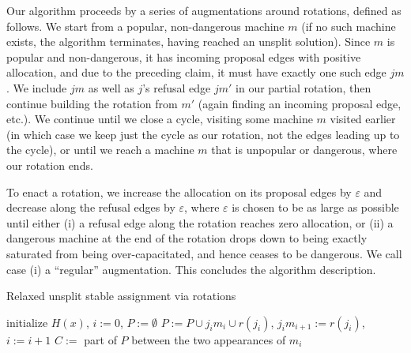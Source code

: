 \documentclass{llncs}
\begin{document}
Our algorithm proceeds by a series of augmentations around rotations,
defined as follows.  We start from a popular, non-dangerous machine
$m$ (if no such machine exists, the algorithm terminates, having
reached an unsplit solution).  Since $m$ is popular and non-dangerous,
it has incoming proposal edges with positive allocation, and due to
the preceding claim, it must have exactly one such edge $jm$.  We
include $jm$ as well as $j$'s refusal edge $jm'$ in our partial
rotation, then continue building the rotation from $m'$ (again finding
an incoming proposal edge, etc.).  We continue until we close a cycle,
visiting some machine $m$ visited earlier (in which case we
keep just the cycle as our rotation, not the edges leading up to the
cycle), or until we reach a machine $m$ that is unpopular or
dangerous, where our rotation ends.

To enact a rotation, we increase the allocation on its proposal edges
by $\varepsilon$ and decrease along the refusal edges by
$\varepsilon$, where $\varepsilon$ is chosen to be as large as
possible until either (i) a refusal edge along the rotation reaches
zero allocation, or (ii) a dangerous machine at the end of the
rotation drops down to being exactly saturated from being
over-capacitated, and hence ceases to be dangerous.  We call case (i)
a ``regular'' augmentation.  This concludes the algorithm description.

\iffalse

\begin{algorithm}[H]
\renewcommand{\thealgorithm}{}
\caption{Relaxed unsplit stable assignment via rotations}
\label{alg:unsplit_rot}
\begin{algorithmic}[1]
	\State initialize $H(x)$, $i := 0$, $P := \emptyset$
		\State\label{add_edge} $P := P \cup j_i m_i \cup r(j_i)$, $j_i m_{i+1} := r(j_i)$, $i := i+ 1$
			\State {}
			\State $C:=$ part of $P$ between the two appearances of $m_i$
			\State {}
				\State {}
			\EndIf
		\EndIf
		\EndWhile
		\State {}
	\EndWhile
\end{algorithmic}
\end{algorithm}
\end{document}
